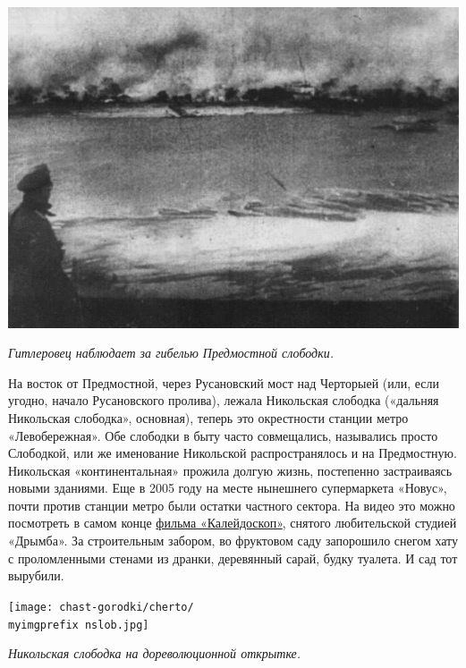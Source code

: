 \begin{center}
\includegraphics[width=\linewidth]{chast-gorodki/cherto/predmpojar-j.jpg}

\textit{Гитлеровец наблюдает за гибелью Предмостной слободки.}
\end{center}
\vspace*{\fill}
На восток от Предмостной, через Русановский мост над Черторыей (или, если угодно, начало Русановского пролива), лежала Никольская слободка («дальняя Никольская слободка», основная), теперь это окрестности станции метро «Левобережная». Обе слободки в быту часто совмещались, назывались просто Слободкой, или же именование Никольской распространялось и на Предмостную. Никольская «континентальная» прожила долгую жизнь, постепенно застраиваясь новыми зданиями. Еще в 2005 году на месте нынешнего супермаркета «Новус», почти против станции метро были остатки частного сектора. На видео это можно посмотреть в самом конце \href{http://www.archive.org/download/Kaleidoscope/kld_mpeg4.avi}{фильма «Калейдоскоп»}, снятого любительской студией «Дрымба». За строительным забором, во фруктовом саду запорошило снегом хату с проломленными стенами из дранки, деревянный сарай, будку туалета. И сад тот вырубили.

\newpage
\vspace*{\fill}
\begin{center}
\texttt{[image: chast-gorodki/cherto/\\myimgprefix nslob.jpg]}

\textit{Никольская слободка на дореволюционной открытке.}
\end{center}

